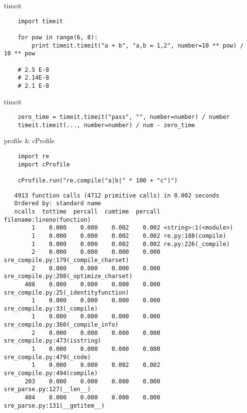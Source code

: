 \documentclass{article}
\begin{document}
\begin{center} timeit \end{center}
\begin{lstlisting}
    import timeit
    
    for pow in range(6, 8):
        print timeit.timeit("a + b", "a,b = 1,2", number=10 ** pow) / 10 ** pow

    # 2.5 E-8
    # 2.14E-8
    # 2.1 E-8
\end{lstlisting}
\newpage

\begin{center} timeit \end{center}
\begin{lstlisting}
    zero_time = timeit.timeit("pass", "", number=number) / number
    timeit.timeit(..., number=number) / num - zero_time
\end{lstlisting}
\newpage

\begin{center} profile & cProfile \end{center}
\begin{lstlisting}
    import re
    import cProfile

    cProfile.run("re.compile("a|b|" * 100 + "c")")
\end{lstlisting}
\begin{verbatim}
   4913 function calls (4712 primitive calls) in 0.002 seconds
   Ordered by: standard name
   ncalls  tottime  percall  cumtime  percall filename:lineno(function)
        1    0.000    0.000    0.002    0.002 <string>:1(<module>)
        1    0.000    0.000    0.002    0.002 re.py:188(compile)
        1    0.000    0.000    0.002    0.002 re.py:226(_compile)
        2    0.000    0.000    0.000    0.000 sre_compile.py:179(_compile_charset)
        2    0.000    0.000    0.000    0.000 sre_compile.py:208(_optimize_charset)
      408    0.000    0.000    0.000    0.000 sre_compile.py:25(_identityfunction)
        1    0.000    0.000    0.000    0.000 sre_compile.py:33(_compile)
        1    0.000    0.000    0.000    0.000 sre_compile.py:360(_compile_info)
        2    0.000    0.000    0.000    0.000 sre_compile.py:473(isstring)
        1    0.000    0.000    0.000    0.000 sre_compile.py:479(_code)
        1    0.000    0.000    0.002    0.002 sre_compile.py:494(compile)
      203    0.000    0.000    0.000    0.000 sre_parse.py:127(__len__)
      404    0.000    0.000    0.000    0.000 sre_parse.py:131(__getitem__)
\end{verbatim}
\newpage
\end{document}
